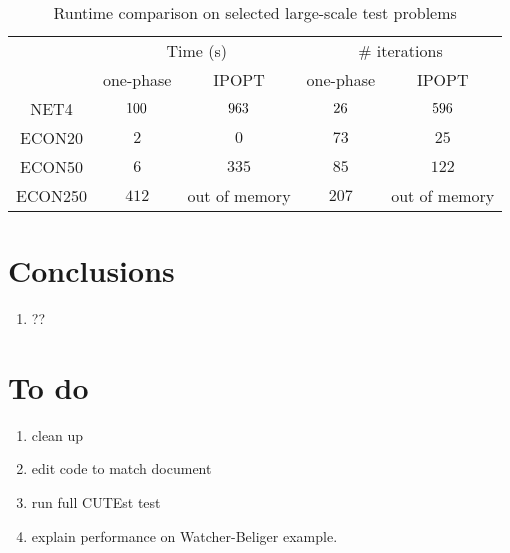 \documentclass{article}
\begin{document}
\begin{table}[H]
\begin{tabular}{|c| c c | c c |}
  \hline
  \multirow{2}{*}{} 
      & \multicolumn{2}{c|}{Time (s)} 
          & \multicolumn{2}{|c|}{\# iterations} \\             \cline{2-5}
  & one-phase & IPOPT & one-phase & IPOPT \\  \hline
  NET4 & $100$ & $963$  & $26$   & $596$ \\      \hline
    ECON20 & $2$  & $0$  & $73$ & $25$   \\      \hline
  ECON50 & $6$  & $335$  & $85$ & $122$   \\      \hline
  ECON250 & $412$  &  out of memory & $207$ & out of memory \\      \hline
\end{tabular}
\caption{Runtime comparison on selected large-scale test problems}\label{compare-runtime}
\end{table}


\if{}


\section{Conclusions}
\begin{enumerate}
\item ??
\end{enumerate}


\section{To do}

\begin{enumerate}
\item clean up 
\item edit code to match document
\item run full CUTEst test
\item explain performance on Watcher-Beliger example.
\end{enumerate}

\fi


\end{document}
